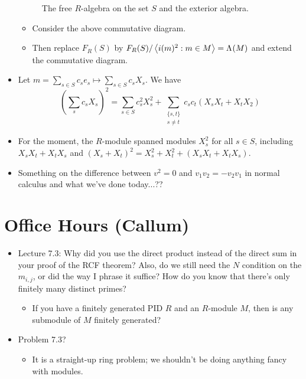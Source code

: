 \documentclass[../notes.tex]{subfiles}
\begin{document}
\begin{itemize}
\begin{figure}[H]
        \caption{The free $R$-algebra on the set $S$ and the exterior algebra.}
        \label{fig:FRSexAlg}
    \end{figure}
    \begin{itemize}
        \item Consider the above commutative diagram.
        \item Then replace $F_R(S)$ by $F_R(S)/\left\langle{i(m)^2:m\in M}\right\rangle=\Lambda^{}(M)$ and extend the commutative diagram.
    \end{itemize}
    \item Let $m=\sum_{s\in S}c_se_s\mapsto\sum_{s\in S}c_sX_s$. We have
    \begin{equation*}
        \left( \sum_sc_sX_s \right)^2 = \sum_{s\in S}c_s^2X_s^2+\sum_{\substack{\{s,t\}\\s\neq t}}c_sc_t(X_sX_t+X_tX_2)
    \end{equation*}
    \item For the moment, the $R$-module spanned modules $X_s^2$ for all $s\in S$, including $X_sX_t+X_tX_s$ and $(X_s+X_t)^2=X_s^2+X_t^2+(X_sX_t+X_tX_s)$.
    \item Something on the difference between $v^2=0$ and $v_1v_2=-v_2v_1$ in normal calculus and what we've done today...??
\end{itemize}



\section{Office Hours (Callum)}
\begin{itemize}
    \item Lecture 7.3: Why did you use the direct product instead of the direct sum in your proof of the RCF theorem? Also, do we still need the $N$ condition on the $m_{i,j}$, or did the way I phrase it suffice? How do you know that there's only finitely many distinct primes?
    \begin{itemize}
        \item If you have a finitely generated PID $R$ and an $R$-module $M$, then is any submodule of $M$ finitely generated?
    \end{itemize}
    \item Problem 7.3?
    \begin{itemize}
        \item It is a straight-up ring problem; we shouldn't be doing anything fancy with modules.
    \end{itemize}
\end{itemize}
\end{document}
